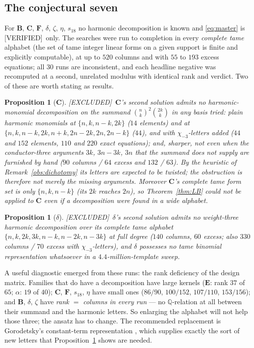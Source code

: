 \documentclass[11pt,reqno]{amsart}
\theoremstyle{plain}
\newtheorem{proposition}[theorem]{Proposition}
\theoremstyle{definition}
\theoremstyle{remark}
\newcommand{\Q}{\mathbb{Q}}
\newcommand{\bin}[2]{\binom{#1}{#2}}
\newcommand{\Verified}{\textup{\textsf{[VERIFIED]}}}
\newcommand{\Excluded}{\textup{\textsf{[EXCLUDED]}}}
\numberwithin{equation}{section}
\begin{document}
\subsection{The conjectural seven}\label{sec:seven}
For $\mathbf B$, $\mathbf C$, $\mathbf F$, $\delta$, $\zeta$, $\eta$, $s_{18}$ no harmonic
decomposition is known and \eqref{eq:master} is \Verified\ only. The searches were run to
completion in every \emph{complete tame} alphabet (the set of tame integer linear forms on a
given support is finite and explicitly computable), at up to $520$ columns and with $55$ to
$193$ excess equations; all $30$ runs are inconsistent, and each headline negative was
recomputed at a second, unrelated modulus with identical rank and verdict. Two of these are
worth stating as results.

\begin{proposition}[$\mathbf C$]\label{prop:C}
\Excluded\ $\mathbf C$'s second solution admits no harmonic-monomial decomposition on the
summand $\bin nk^2\bin{2k}k$ in any basis tried: plain harmonic monomials at $\{n,k,n-k,2k\}$
($14$ elements) and at $\{n,k,n-k,2k,n+k,2n-2k,2n,2n-k\}$ ($44$), and with
$\chi_{-3}$-letters added ($44$ and $152$ elements, $110$ and $220$ exact equations); and,
sharper, not even when the conductor-three arguments $3k$, $3n-3k$, $3n$ that the summand
does not supply are furnished by hand ($90$ columns / $64$ excess and $132$ / $63$). By
the heuristic of Remark~\ref{obs:dichotomy} its letters are expected to be twisted; the
obstruction is therefore not merely the missing arguments. Moreover $\mathbf C$'s complete tame form set is only
$\{n,k,n-k\}$ (its $2k$ reaches $2n$), so Theorem~\ref{thm:LB} could not be applied to
$\mathbf C$ even if a decomposition were found in a wide alphabet.
\end{proposition}

\begin{proposition}[$\delta$]\label{prop:delta}
\Excluded\ $\delta$'s second solution admits no weight-three harmonic decomposition over its
complete tame alphabet $\{n,k,2k,3k,n-k,n-2k,n-3k\}$ at full degree ($140$ columns, $60$
excess; also $330$ columns / $70$ excess with $\chi_{-3}$-letters), and $\delta$ possesses no
tame binomial representation whatsoever in a $4.4$-million-template sweep.
\end{proposition}

A useful diagnostic emerged from these runs: the rank deficiency of the design matrix.
Families that do have a decomposition have large kernels ($\mathbf E$: rank $37$ of $65$;
$\alpha$: $19$ of $40$); $\mathbf C$, $\mathbf F$, $s_{18}$, $\eta$ have small ones
($86/90$, $100/152$, $107/110$, $153/156$); and $\mathbf B$, $\delta$, $\zeta$ have
\emph{rank $=$ columns in every run} --- no $\Q$-relation at all between their summand and
the harmonic letters. So enlarging the alphabet will not help those three; the ansatz has to
change. The recommended replacement is Gorodetsky's constant-term representation
\cite{Gorodetsky}, which supplies exactly the sort of new letters that
Proposition~\ref{prop:C} shows are needed.
\end{document}
